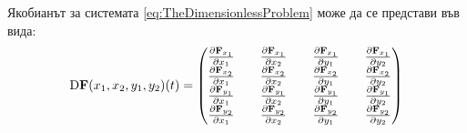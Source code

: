 
Якобианът за системата \ref{eq:TheDimensionlessProblem} може да се представи във вида:
\begin{equation}
  \mathrm{D} \mathbf{F}(x_1, x_2, y_1, y_2)(t) =
  \begin{pmatrix}
    \pdv{\mathbf{F}_{x_1}}{x_1} && \pdv{\mathbf{F}_{x_1}}{x_2} && \pdv{\mathbf{F}_{x_1}}{y_1} && \pdv{\mathbf{F}_{x_1}}{y_2} \\
    \pdv{\mathbf{F}_{x_2}}{x_1} && \pdv{\mathbf{F}_{x_2}}{x_2} && \pdv{\mathbf{F}_{x_2}}{y_1} && \pdv{\mathbf{F}_{x_2}}{y_2} \\
    \pdv{\mathbf{F}_{y_1}}{x_1} && \pdv{\mathbf{F}_{y_1}}{x_2} && \pdv{\mathbf{F}_{y_1}}{y_1} && \pdv{\mathbf{F}_{y_1}}{y_2} \\
    \pdv{\mathbf{F}_{y_2}}{x_1} && \pdv{\mathbf{F}_{y_2}}{x_2} && \pdv{\mathbf{F}_{y_2}}{y_1} && \pdv{\mathbf{F}_{y_2}}{y_2}
  \end{pmatrix}
  \end{equation}

